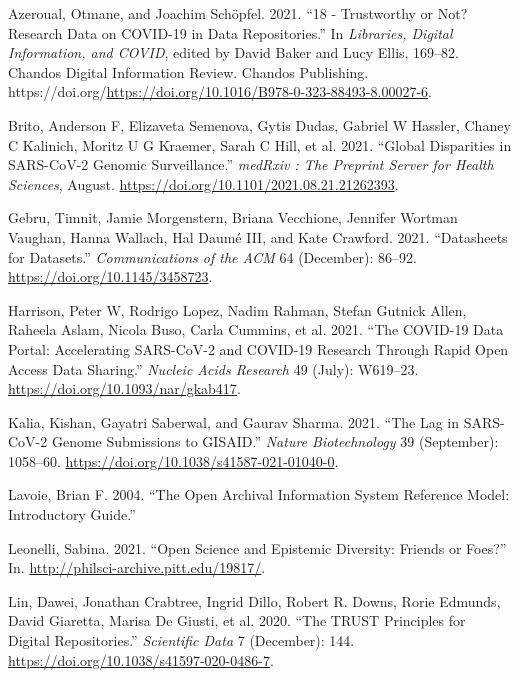 \documentclass{article}
\newlength{\cslhangindent}
\newlength{\cslentryspacingunit} %
\newenvironment{CSLReferences}[2] %
 {%
  \setlength{\parindent}{0pt}
  \ifodd #1
  \let\oldpar\par
  \def\par{\hangindent=\cslhangindent\oldpar}
  \fi
  \setlength{\parskip}{#2\cslentryspacingunit}
 }%
 {}
\begin{document}
\hypertarget{refs}{}
\begin{CSLReferences}{1}{0}
\leavevmode\hypertarget{ref-AZEROUAL2021169}{}%
Azeroual, Otmane, and Joachim Schöpfel. 2021. {``18 - Trustworthy or
Not? Research Data on COVID-19 in Data Repositories.''} In
\emph{Libraries, Digital Information, and COVID}, edited by David Baker
and Lucy Ellis, 169--82. Chandos Digital Information Review. Chandos
Publishing.
https://doi.org/\url{https://doi.org/10.1016/B978-0-323-88493-8.00027-6}.

\leavevmode\hypertarget{ref-Brito2021}{}%
Brito, Anderson F, Elizaveta Semenova, Gytis Dudas, Gabriel W Hassler,
Chaney C Kalinich, Moritz U G Kraemer, Sarah C Hill, et al. 2021.
{``Global Disparities in SARS-CoV-2 Genomic Surveillance.''}
\emph{medRxiv : The Preprint Server for Health Sciences}, August.
\url{https://doi.org/10.1101/2021.08.21.21262393}.

\leavevmode\hypertarget{ref-Gebru2021}{}%
Gebru, Timnit, Jamie Morgenstern, Briana Vecchione, Jennifer Wortman
Vaughan, Hanna Wallach, Hal Daumé III, and Kate Crawford. 2021.
{``Datasheets for Datasets.''} \emph{Communications of the ACM} 64
(December): 86--92. \url{https://doi.org/10.1145/3458723}.

\leavevmode\hypertarget{ref-Harrison2021}{}%
Harrison, Peter W, Rodrigo Lopez, Nadim Rahman, Stefan Gutnick Allen,
Raheela Aslam, Nicola Buso, Carla Cummins, et al. 2021. {``The COVID-19
Data Portal: Accelerating SARS-CoV-2 and COVID-19 Research Through Rapid
Open Access Data Sharing.''} \emph{Nucleic Acids Research} 49 (July):
W619--23. \url{https://doi.org/10.1093/nar/gkab417}.

\leavevmode\hypertarget{ref-Kalia2021}{}%
Kalia, Kishan, Gayatri Saberwal, and Gaurav Sharma. 2021. {``The Lag in
SARS-CoV-2 Genome Submissions to GISAID.''} \emph{Nature Biotechnology}
39 (September): 1058--60.
\url{https://doi.org/10.1038/s41587-021-01040-0}.

\leavevmode\hypertarget{ref-lavoie2004open}{}%
Lavoie, Brian F. 2004. {``The Open Archival Information System Reference
Model: Introductory Guide.''}

\leavevmode\hypertarget{ref-pittphilsci19817}{}%
Leonelli, Sabina. 2021. {``Open Science and Epistemic Diversity: Friends
or Foes?''} In. \url{http://philsci-archive.pitt.edu/19817/}.

\leavevmode\hypertarget{ref-Lin2020}{}%
Lin, Dawei, Jonathan Crabtree, Ingrid Dillo, Robert R. Downs, Rorie
Edmunds, David Giaretta, Marisa De Giusti, et al. 2020. {``The TRUST
Principles for Digital Repositories.''} \emph{Scientific Data} 7
(December): 144. \url{https://doi.org/10.1038/s41597-020-0486-7}.


\end{CSLReferences}
\end{document}
